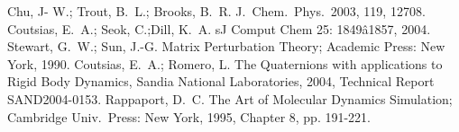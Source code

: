 \documentclass[9pt,lineno]{elife}
\begin{document}

%


\begin{thebibliography}{99} 
 Chu, J- W.; Trout, B.\ L.; Brooks, B.\ R. J.\
Chem.\ Phys.\ 2003, 119, 12708.
 Coutsias, E.\ A.; Seok, C.;Dill, K.\ A.
sJ Comput Chem 25: 1849â1857, 2004.
 Stewart, G.\ W.; Sun, J.-G. Matrix Perturbation
Theory; Academic Press: New York, 1990.
 Coutsias, E.\ A.; Romero, L.
The Quaternions with applications to Rigid Body Dynamics,
Sandia National Laboratories, 2004,
Technical Report SAND2004-0153.
 Rappaport, D.\ C. The Art of Molecular Dynamics 
Simulation; Cambridge Univ.\ Press: New York, 1995, Chapter 8, pp. 191-221.
\end{thebibliography} 









\end{document}
